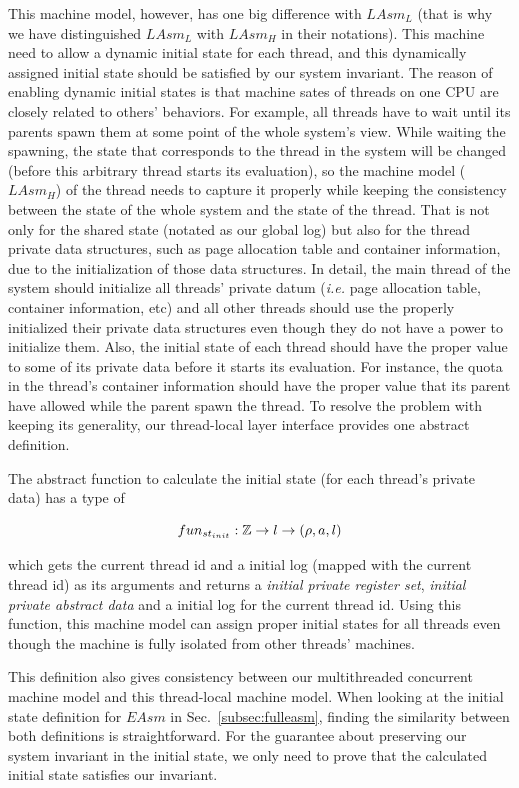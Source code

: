 This machine model, however, has one big difference with $LAsm_L$ (that is why we have
distinguished $LAsm_L$ with $LAsm_H$ in their notations).
This machine need to allow a dynamic initial state for each thread, and this dynamically assigned 
initial state should be satisfied by our system invariant.
The reason of enabling dynamic initial states is that machine sates of threads on one CPU are 
closely related to  others' behaviors.
For example,
all threads have to wait until its parents spawn them at some point of the whole system's view.
While waiting the spawning, the state that corresponds to the thread in the system will be changed  
(before this arbitrary thread starts its evaluation), 
so the machine model ($LAsm_H$) of the thread needs to capture it properly while 
keeping the consistency between the state of the whole system and the state of the thread.
That is not only for the shared state (notated as our global log) 
but also for the thread private data structures, such as 
page allocation table and container information, due to the initialization of those data structures. 
In detail, the main thread of the system should initialize all threads' private datum (\textit{i.e.}
page allocation table, container information, etc)
and all other threads should use the properly initialized their private data structures 
even though they do not have a power to initialize them.
Also, the initial state of each thread should have the proper value to some of its private data before it starts its evaluation. 
For instance, the quota in the thread's container information should have the proper value that its 
parent have allowed while the parent spawn the thread.
To resolve the problem with keeping its generality,
our thread-local layer interface provides one abstract definition.

The abstract function to calculate the initial state (for each thread's private data) has a type of
\begin{small}
\[
fun_{st_{init}} : \mathbb{Z} \rightarrow l \rightarrow (\rho, a, l)
\]
\end{small}
which gets the current thread id and a initial log (mapped with the current thread id) as its arguments 
and returns a \textit{initial private register set}, \textit{initial private abstract data} and a initial log for the 
current thread id.
Using this function, 
this machine model can assign proper initial states for all threads even though 
the machine is fully isolated from other threads' machines.

This definition also gives consistency between our multithreaded concurrent machine model 
and this thread-local machine model.
When looking at the initial state definition for $EAsm$ in Sec.~\ref{subsec:fulleasm},
finding the similarity between both definitions is straightforward.
For the guarantee about preserving our system invariant in the initial state, we only need to prove that 
the calculated initial state satisfies our invariant.


